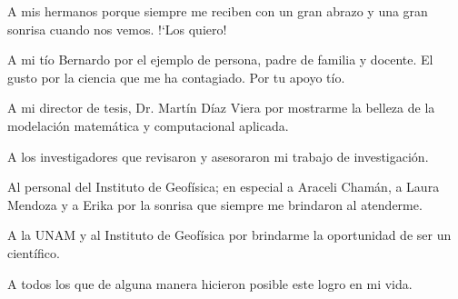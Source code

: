 \hfill \begin{minipage}[c]{0.7\linewidth}
A mis hermanos porque siempre me reciben con un gran abrazo y una gran sonrisa cuando nos vemos. !`Los quiero!

\vspace{0.5cm}

A mi t\'io Bernardo por el ejemplo de persona, padre de familia y docente. El gusto por la ciencia que me ha contagiado. Por tu apoyo t\'io.

\vspace{0.5cm}

A mi director de tesis, Dr. Mart\'in D\'iaz Viera por mostrarme la belleza de la modelaci\'on matem\'atica y computacional aplicada.

\vspace{0.5cm}

A los investigadores que revisaron y asesoraron mi trabajo de investigaci\'on.

\vspace{0.5cm}

Al personal del Instituto de Geof\'isica; en especial a Araceli Cham\'an, a Laura Mendoza y a Erika por la sonrisa que siempre me brindaron al atenderme.

\vspace{0.5cm}

A la UNAM y al Instituto de Geof\'isica por brindarme la oportunidad de ser un cient\'ifico.

\vspace{0.5cm}

A todos los que de alguna manera hicieron posible este logro en mi vida.

\end{minipage}

\vfill
